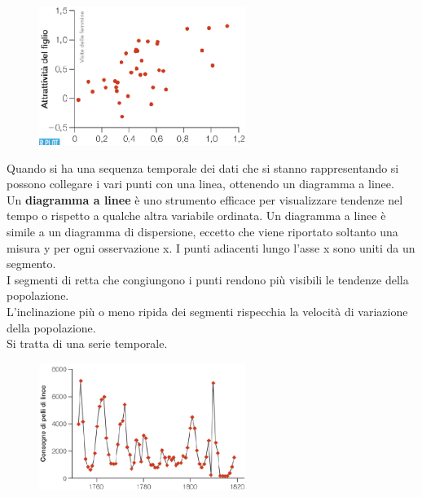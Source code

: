 \documentclass[10pt, draft]{book}
\begin{document}
    \begin{figure}[h]\label{fig2.5-1}
    \centering
    \includegraphics[width=0.6\textwidth]{fig2.5-1}
    \caption{\small{}}
    \end{figure}

Quando si ha una sequenza temporale dei dati che si stanno rappresentando si possono collegare i vari punti con una linea, ottenendo un diagramma a linee.
\\
Un \textbf{diagramma a linee} è uno strumento efficace per visualizzare tendenze nel tempo o rispetto a qualche altra variabile ordinata. Un diagramma a linee è simile a un diagramma di dispersione, eccetto che viene riportato soltanto una misura y per ogni osservazione x. I punti adiacenti lungo l'asse x sono uniti da un segmento.
\\
I segmenti di retta che congiungono i punti rendono più visibili le tendenze della popolazione. 
\\
L'inclinazione più o meno ripida dei segmenti rispecchia la velocità di variazione della popolazione.
\\
Si tratta di una serie temporale.
\clearpage
    \begin{figure}[h]\label{fig2.5-2}
    \centering
    \includegraphics[width=0.6\textwidth]{fig2.5-2}
    \caption{\small{}}
    \end{figure}
\end{document}
